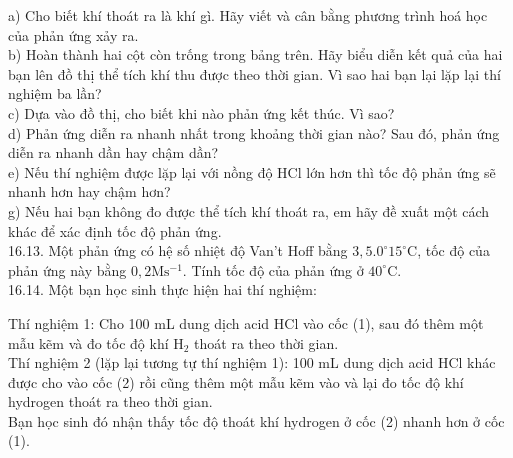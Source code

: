 \documentclass[10pt]{article}
\begin{document}
a) Cho biết khí thoát ra là khí gì. Hãy viết và cân bằng phương trình hoá học của phản ứng xảy ra.\\
b) Hoàn thành hai cột còn trống trong bảng trên. Hãy biểu diễn kết quả của hai bạn lên đồ thị thể tích khí thu được theo thời gian. Vì sao hai bạn lại lặp lại thí nghiệm ba lần?\\
c) Dựa vào đồ thị, cho biết khi nào phản ứng kết thúc. Vì sao?\\
d) Phản ứng diễn ra nhanh nhất trong khoảng thời gian nào? Sau đó, phản ứng diễn ra nhanh dần hay chậm dần?\\
e) Nếu thí nghiệm được lặp lại với nồng độ HCl lớn hơn thì tốc độ phản ứng sẽ nhanh hơn hay chậm hơn?\\
g) Nếu hai bạn không đo được thể tích khí thoát ra, em hãy đề xuất một cách khác để xác định tốc độ phản ứng.\\
16.13. Một phản ứng có hệ số nhiệt độ Van't Hoff bằng $3,5.0^{\circ} 15^{\circ} \mathrm{C}$, tốc độ của phản ứng này bằng $0,2 \mathrm{M} \mathrm{s}^{-1}$. Tính tốc độ của phản ứng ở $40^{\circ} \mathrm{C}$.\\
16.14. Một bạn học sinh thực hiện hai thí nghiệm:

Thí nghiệm 1: Cho 100 mL dung dịch acid HCl vào cốc (1), sau đó thêm một mẫu kẽm và đo tốc độ khí $\mathrm{H}_{2}$ thoát ra theo thời gian.\\
Thí nghiệm 2 (lặp lại tương tự thí nghiệm 1): 100 mL dung dịch acid HCl khác được cho vào cốc (2) rồi cũng thêm một mẫu kẽm vào và lại đo tốc độ khí hydrogen thoát ra theo thời gian.\\
Bạn học sinh đó nhận thấy tốc độ thoát khí hydrogen ở cốc (2) nhanh hơn ở cốc (1).
\end{document}
